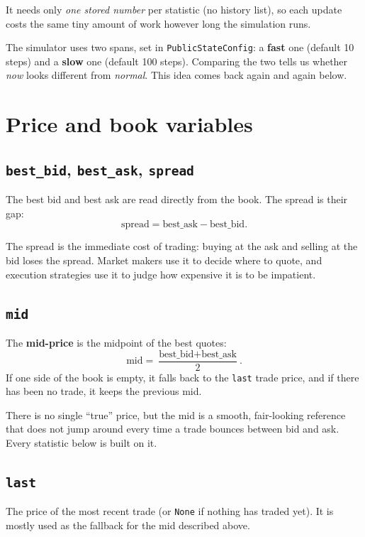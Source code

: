 \documentclass[11pt,a4paper]{article}
\newcommand{\code}[1]{\texttt{#1}}
\begin{document}
\begin{whyuse}
It needs only \emph{one stored number} per statistic (no history list), so each update costs the same
tiny amount of work however long the simulation runs.
\end{whyuse}

The simulator uses two spans, set in \code{PublicStateConfig}: a \textbf{fast} one (default
10 steps) and a \textbf{slow} one (default 100 steps). Comparing the two tells us whether
\emph{now} looks different from \emph{normal}. This idea comes back again and again below.

\section{Price and book variables}

\subsection{\code{best\_bid}, \code{best\_ask}, \code{spread}}
The best bid and best ask are read directly from the book. The spread is their gap:
\[
  \text{spread} = \text{best\_ask} - \text{best\_bid}.
\]
\begin{whyuse}
The spread is the immediate cost of trading: buying at the ask and selling at the bid loses the
spread. Market makers use it to decide where to quote, and execution strategies use it to judge how
expensive it is to be impatient.
\end{whyuse}

\subsection{\code{mid}}
The \textbf{mid-price} is the midpoint of the best quotes:
\[
  \text{mid} = \frac{\text{best\_bid} + \text{best\_ask}}{2}.
\]
If one side of the book is empty, it falls back to the \code{last} trade price, and if there has been
no trade, it keeps the previous mid.

\begin{whyuse}
There is no single ``true'' price, but the mid is a smooth, fair-looking reference that does not
jump around every time a trade bounces between bid and ask. Every statistic below is built on it.
\end{whyuse}

\subsection{\code{last}}
The price of the most recent trade (or \code{None} if nothing has traded yet). It is mostly used as
the fallback for the mid described above.
\end{document}
